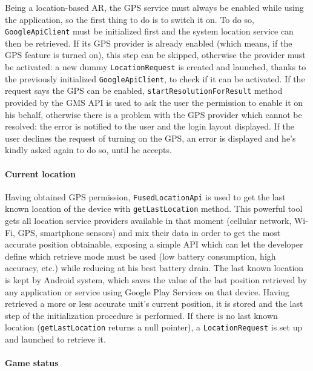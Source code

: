 			Being a location-based AR, the GPS service must always be enabled while using the application, so the first thing to do is to switch it on.
			To do so, \lstinline|GoogleApiClient| must be initialized first and the system location service can then be retrieved.
			If its GPS provider is already enabled (which means, if the GPS feature is turned on), this step can be skipped, otherwise the provider must be activated: a new dummy \lstinline|LocationRequest| is created and launched, thanks to the previously initialized \lstinline|GoogleApiClient|, to check if it can be activated.
			If the request says the GPS can be enabled,  \lstinline|startResolutionForResult| method provided by the GMS API is used to ask the user the permission to enable it on his behalf, otherwise there is a problem with the GPS provider which cannot be resolved: the error is notified to the user and the login layout displayed.
			If the user declines the request of turning on the GPS, an error is displayed and he's kindly asked again to do so, until he accepts.
			
			\paragraph{Current location}
			
			Having obtained GPS permission, \lstinline|FusedLocationApi| is used to get the last known location of the device with  \lstinline|getLastLocation| method.
			This powerful tool gets all location service providers available in that moment (cellular network, Wi-Fi, GPS, smartphone sensors) and mix their data in order to get the most accurate position obtainable, exposing a simple API which can let the developer define which retrieve mode must be used (low battery consumption, high accuracy, etc.) while reducing at his best battery drain.
			The last known location is kept by Android system, which saves the value of the last position retrieved by any application or service using Google Play Services on that device.
			Having retrieved a more or less accurate unit's current position, it is stored and the last step of the initialization procedure is performed.
			If there is no last known location (\lstinline|getLastLocation| returns a null pointer), a \lstinline|LocationRequest| is set up and launched to retrieve it.
			
			\paragraph{Game status}
			
